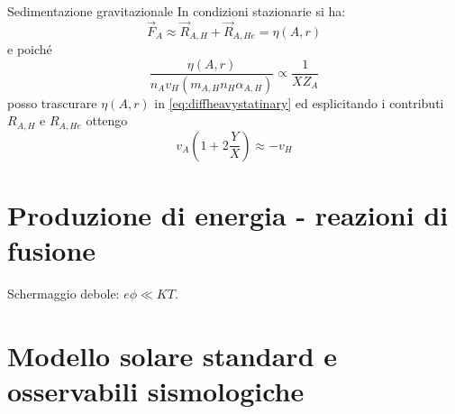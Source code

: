 \begin{frame}{Sedimentazione gravitazionale}
In condizioni stazionarie si ha:
\begin{equation}\label{eq:diffheavystatinary}
\vec{F}_A\approx\vec{R}_{A,H}+\vec{R}_{A,He}=\eta(A,r)
\end{equation}
e poich\'e
\begin{equation}
\frac{\eta(A,r)}{n_Av_H(m_{A,H}n_H\alpha_{A,H})}\propto\frac{1}{XZ_A}
\end{equation}
posso trascurare $\eta(A,r)$ in \eqref{eq:diffheavystatinary} ed esplicitando i contributi $R_{A,H}$ e $R_{A,He}$
ottengo
\begin{equation}\label{eq:diffvelocityA}
v_A(1+2\frac{Y}{X})\approx-v_H
\end{equation}

\end{frame}

\begin{comment}%
\begin{minipage}{\linewidth}
\begin{tikzpicture}
\node[inner sep=0pt] (image) at (0,0)
  {\texttt{[image: Hdiffusion]}};
  \draw [thick,dotted] (-3.4,1.5) -- (-3,1.5) node[right] {$\propto\nabla c$};
 \draw [thick,dashed] (-3.4,1.9) -- (-3,1.9) node[right] {$\propto\nabla T$};
    \draw [thick,dash dot] (-3.4,2.3) -- (-3,2.3) node[right] {$\propto\nabla P$};
    \node (caption) at (8.5,-2.5) { \begin{minipage}[c]{0.48\textwidth}
\captionof{figure}{Contributi alla velocit\'a di diffusione di H-He in modello solare. Da \cite{wam88hydrogen}.}%
    \end{minipage}};
\node[] (massconsdiff) at (8.5,1) {\begin{minipage}[c]{0.48\textwidth}
\end{minipage}
};
\end{tikzpicture}
\end{minipage}
\end{comment}


\section{Produzione di energia - reazioni di fusione}

\begin{block}{Schermaggio debole: $e\phi\ll KT$.}



\end{block}

\section{Modello solare standard e osservabili sismologiche}


